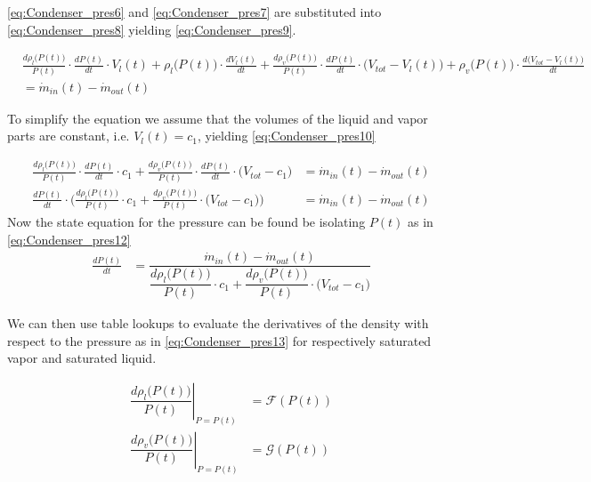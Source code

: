 \cref{eq:Condenser_pres6} and \cref{eq:Condenser_pres7} are substituted into \cref{eq:Condenser_pres8} yielding \cref{eq:Condenser_pres9}.

\begin{equation}\label{eq:Condenser_pres9}
	\begin{split}
		& \frac{d \rho_{l}\bigl(P(t)\bigr)}{P(t)} \cdot \frac{dP(t)}{dt} \cdot V_l(t)   +   \rho_{l}\bigl(P(t)\bigr)\cdot\frac{d V_l(t)}{dt} +  \frac{d \rho_{v}\bigl(P(t)\bigr)}{P(t)} \cdot \frac{dP(t)}{dt} \cdot \bigl(V_{tot} - V_l(t)\bigr)   +
		\rho_{v}\bigl(P(t)\bigr)\cdot\frac{d \bigl(V_{tot} - V_l(t)\bigr)}{dt}  \\ &= \dot{m}_{in}(t) - \dot{m}_{out}(t)
	\end{split}
\end{equation}

To simplify the equation we assume that the volumes of the liquid and vapor parts are constant, i.e. $ V_l(t) = c_1$, yielding \cref{eq:Condenser_pres10}

\begin{align}
		\frac{d \rho_{l}\bigl(P(t)\bigr)}{P(t)} \cdot \frac{dP(t)}{dt} \cdot c_1 +  \frac{d \rho_{v}\bigl(P(t)\bigr)}{P(t)} \cdot \frac{dP(t)}{dt} \cdot \bigl(V_{tot} - c_1\bigr) & = \dot{m}_{in}(t) - \dot{m}_{out}(t) \label{eq:Condenser_pres10} \\
		 \frac{dP(t)}{dt} \cdot \Biggl( \frac{d \rho_{l}\bigl(P(t)\bigr)}{P(t)} \cdot c_1 +  \frac{d \rho_{v}\bigl(P(t)\bigr)}{P(t)} \cdot \bigl(V_{tot} - c_1\bigr) \Biggr) & = \dot{m}_{in}(t) - \dot{m}_{out}(t) \label{eq:Condenser_pres11}
\end{align}
Now the state equation for the pressure can be found be isolating $ P(t) $ as in \cref{eq:Condenser_pres12}
\begin{align}
	\frac{dP(t)}{dt} & = \dfrac{\dot{m}_{in}(t) - \dot{m}_{out}(t)}{ \dfrac{d \rho_{l}\bigl(P(t)\bigr)}{P(t)} \cdot c_1 +  \dfrac{d \rho_{v}\bigl(P(t)\bigr)}{P(t)} \cdot \bigl(V_{tot} - c_1\bigr) } \label{eq:Condenser_pres12}
\end{align}


We can then use table lookups to evaluate the derivatives of the density with respect to the pressure as in \cref{eq:Condenser_pres13} for respectively saturated vapor and saturated liquid.

\begin{align}
		\left. \dfrac{d \rho_l\bigl(P(t)\bigr)}{P(t)} \right |_{P = P(t)} & = \mathcal{F}(P(t)) \label{eq:Condenser_pres13} \\
		\left. \dfrac{d \rho_v\bigl(P(t)\bigr)}{P(t)} \right |_{P = P(t)} & = \mathcal{G}(P(t)) \label{eq:Condenser_pres14}
\end{align}

